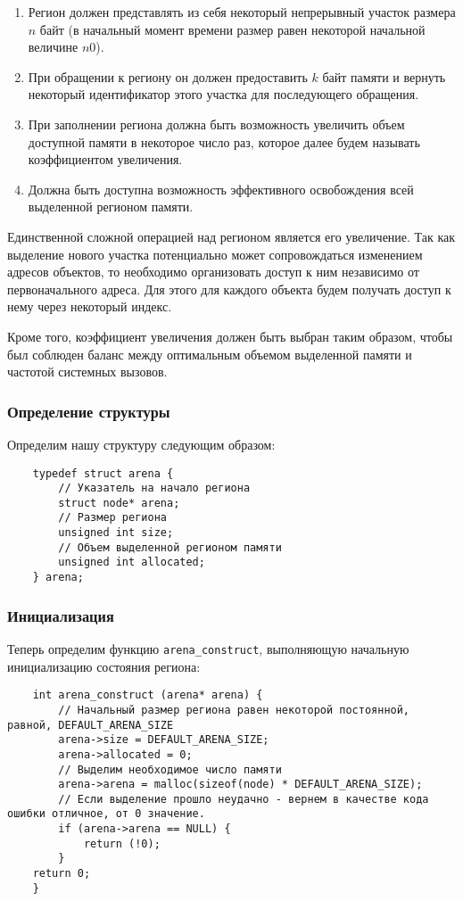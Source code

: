 \begin{enumerate}
    \item Регион должен представлять из себя некоторый непрерывный участок размера \(n\) байт (в начальный момент времени размер равен некоторой начальной величине \(n0\)).
    \item При обращении к региону он должен предоставить \(k\) байт памяти и вернуть некоторый идентификатор этого участка для последующего обращения.
    \item При заполнении региона должна быть возможность увеличить объем доступной памяти в некоторое число раз, которое далее будем называть коэффициентом увеличения.
    \item Должна быть доступна возможность эффективного освобождения всей выделенной регионом памяти.
\end{enumerate}

Единственной сложной операцией над регионом является его увеличение. Так как выделение нового участка потенциально может сопровождаться изменением адресов объектов, то необходимо организовать доступ к ним независимо от первоначального адреса. Для этого для каждого объекта будем получать доступ к нему через некоторый индекс.

Кроме того, коэффициент увеличения должен быть выбран таким образом, чтобы был соблюден баланс между оптимальным объемом выделенной памяти и частотой системных вызовов.

\subsubsection{Определение структуры}
Определим нашу структуру следующим образом:
\begin{verbatim}
    typedef struct arena {
        // Указатель на начало региона
        struct node* arena;
        // Размер региона
        unsigned int size;
        // Объем выделенной регионом памяти
        unsigned int allocated;
    } arena;
\end{verbatim}

\subsubsection{Инициализация}
Теперь определим функцию \verb|arena_construct|, выполняющую начальную инициализацию состояния региона:

\begin{verbatim}
    int arena_construct (arena* arena) {
        // Начальный размер региона равен некоторой постоянной, равной, DEFAULT_ARENA_SIZE
        arena->size = DEFAULT_ARENA_SIZE;
        arena->allocated = 0;
        // Выделим необходимое число памяти
        arena->arena = malloc(sizeof(node) * DEFAULT_ARENA_SIZE);
        // Если выделение прошло неудачно - вернем в качестве кода ошибки отличное, от 0 значение.
        if (arena->arena == NULL) {
            return (!0);
        }
    return 0;
    }
\end{verbatim}

